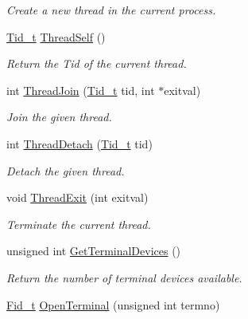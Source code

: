 \begin{DoxyCompactItemize}
\begin{DoxyCompactList}\small\item\em Create a new thread in the current process. \end{DoxyCompactList}\item 
\mbox{\label{group__syscalls_ga75ffeb50fda6297110a2f07ef94d285c}} 
\hyperlink{group__syscalls_gaf67ad1c55e6b2a79bf8a99106380ce01}{Tid\+\_\+t} \hyperlink{group__syscalls_ga75ffeb50fda6297110a2f07ef94d285c}{Thread\+Self} ()
\begin{DoxyCompactList}\small\item\em Return the Tid of the current thread. \end{DoxyCompactList}\item 
int \hyperlink{group__syscalls_ga9ffbb344eb33487ceef5442846a74be0}{Thread\+Join} (\hyperlink{group__syscalls_gaf67ad1c55e6b2a79bf8a99106380ce01}{Tid\+\_\+t} tid, int $\ast$exitval)
\begin{DoxyCompactList}\small\item\em Join the given thread. \end{DoxyCompactList}\item 
int \hyperlink{group__syscalls_ga5f957d985678728a418ff70a617fab4d}{Thread\+Detach} (\hyperlink{group__syscalls_gaf67ad1c55e6b2a79bf8a99106380ce01}{Tid\+\_\+t} tid)
\begin{DoxyCompactList}\small\item\em Detach the given thread. \end{DoxyCompactList}\item 
\mbox{\label{group__syscalls_gab77e59bf31165db88a22ac8f031b8741}} 
void \hyperlink{group__syscalls_gab77e59bf31165db88a22ac8f031b8741}{Thread\+Exit} (int exitval)
\begin{DoxyCompactList}\small\item\em Terminate the current thread. \end{DoxyCompactList}\item 
unsigned int \hyperlink{group__syscalls_ga31576e1579c15b6b066038702e6557c7}{Get\+Terminal\+Devices} ()
\begin{DoxyCompactList}\small\item\em Return the number of terminal devices available. \end{DoxyCompactList}\item 
\hyperlink{group__syscalls_ga5097222c5f0da97d92d4712359abc38f}{Fid\+\_\+t} \hyperlink{group__syscalls_ga6ea2b586a8dfcfc1e7065e1664a0fb35}{Open\+Terminal} (unsigned int termno)

\end{DoxyCompactItemize}
